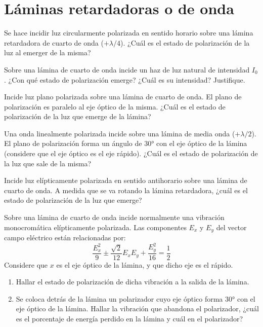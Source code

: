 \section*{Láminas retardadoras o de onda}

\item Se hace incidir luz circularmente polarizada en sentido horario sobre una lámina retardadora de cuarto de onda ($+\lambda/4$).
¿Cuál es el estado de polarización de la luz al emerger de la misma?



\item Sobre una lámina de cuarto de onda incide un haz de luz natural de intensidad $I_0$.
¿Con qué estado de polarización emerge?
¿Cuál es su intensidad?
Justifique.



\item Incide luz plano polarizada sobre una lámina de cuarto de onda.
El plano de polarización es paralelo al eje óptico de la misma.
¿Cuál es el estado de polarización de la luz que emerge de la lámina?



\item Una onda linealmente polarizada incide sobre una lámina de media onda ($+\lambda/2$).
El plano de polarización forma un ángulo de \ang{30;;} con el eje óptico de la lámina (considere que el eje óptico es el eje rápido).
¿Cuál es el estado de polarización de la luz que sale de la misma?



\item Incide luz elípticamente polarizada en sentido antihorario sobre una lámina de cuarto de onda.
A medida que se va rotando la lámina retardadora, ¿cuál es el estado de polarización de la luz que emerge?



\item Sobre una lámina de cuarto de onda incide normalmente una vibración monocromática elípticamente polarizada.
Las componentes $E_x$ y $E_y$ del vector campo eléctrico están relacionadas por:
\[
	\frac{ E_x^2 }{ 9 } \pm \frac{ \sqrt{ 2 } }{ 12 } E_x E_y + \frac{ E_y^2 }{ 16 } = \frac{ 1 }{ 2 }
\]
Considere que $x$ es el eje óptico de la lámina, y que dicho eje es el rápido.
\begin{enumerate}
	\item Hallar el estado de polarización de dicha vibración a la salida de la lámina.
	\item Se coloca detrás de la lámina un polarizador cuyo eje óptico forma \ang{30;;} con el eje óptico de la lámina.
	Hallar la vibración que abandona el polarizador, ¿cuál es el porcentaje de energía perdido en la lámina y cuál en el polarizador?
\end{enumerate}
